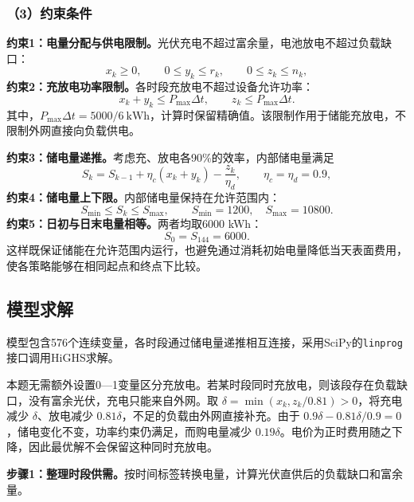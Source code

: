 \subsubsection*{（3）约束条件}
\noindent\textbf{约束1：电量分配与供电限制。}光伏充电不超过富余量，电池放电不超过负载缺口：
\begin{equation}
x_k\ge0,\qquad 0\le y_k\le r_k,\qquad 0\le z_k\le n_k,
\label{eq:q1_supply_constraint}
\end{equation}
\noindent\textbf{约束2：充放电功率限制。}各时段充放电不超过设备允许功率：
\begin{equation}
x_k+y_k\le P_{\max}\Delta t,\qquad z_k\le P_{\max}\Delta t.
\label{eq:q1_power_constraint}
\end{equation}
其中，$P_{\max}\Delta t=5000/6\ \mathrm{kWh}$，计算时保留精确值。该限制作用于储能充放电，不限制外网直接向负载供电。

\noindent\textbf{约束3：储电量递推。}考虑充、放电各90\%的效率，内部储电量满足
\begin{equation}
S_k=S_{k-1}+\eta_c(x_k+y_k)-\frac{z_k}{\eta_d},\qquad \eta_c=\eta_d=0.9,
\label{eq:q1_soc_transition}
\end{equation}
\noindent\textbf{约束4：储电量上下限。}内部储电量保持在允许范围内：
\begin{equation}
S_{\min}\le S_k\le S_{\max},\qquad S_{\min}=1200,\quad S_{\max}=10800.
\label{eq:q1_soc_bound}
\end{equation}
\noindent\textbf{约束5：日初与日末电量相等。}两者均取6000 kWh：
\begin{equation}
S_0=S_{144}=6000.
\label{eq:q1_terminal_constraint}
\end{equation}
这样既保证储能在允许范围内运行，也避免通过消耗初始电量降低当天表面费用，使各策略能够在相同起点和终点下比较。

\subsection{模型求解}
模型包含576个连续变量，各时段通过储电量递推相互连接，采用SciPy的\texttt{linprog}接口调用HiGHS求解。

本题无需额外设置0—1变量区分充放电。若某时段同时充放电，则该段存在负载缺口，没有富余光伏，充电只能来自外网。取 $\delta=\min(x_k,z_k/0.81)>0$，将充电减少 $\delta$、放电减少 $0.81\delta$，不足的负载由外网直接补充。由于 $0.9\delta-0.81\delta/0.9=0$，储电变化不变，功率约束仍满足，而购电量减少 $0.19\delta$。电价为正时费用随之下降，因此最优解不会保留这种同时充放电。

\noindent\textbf{步骤1：整理时段供需。}按时间标签转换电量，计算光伏直供后的负载缺口和富余量。

